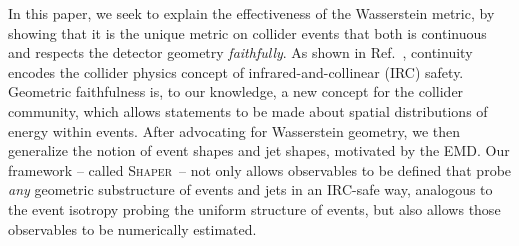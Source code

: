 \documentclass[letterpaper,11pt]{article}
\DeclareRobustCommand{\Refer}[1]{Ref.~\cite{#1}}
\newcommand{\Shaper}{\textsc{Shaper}\xspace}
\begin{document}
In this paper, we seek to explain the effectiveness of the Wasserstein metric, by showing that it is the unique metric on collider events that both is continuous and respects the detector geometry \emph{faithfully}.
%
As shown in \Refer{Komiske_2019}, continuity encodes the collider physics concept of infrared-and-collinear (IRC) safety.
%
Geometric faithfulness is, to our knowledge, a new concept for the collider community, which allows statements to be made about spatial distributions of energy within events. 
%
After advocating for Wasserstein geometry, we then generalize the notion of event shapes and jet shapes, motivated by the EMD.
%
Our framework -- called \Shaper\ -- not only allows observables to be defined that probe \emph{any} geometric substructure of events and jets in an IRC-safe way, analogous to the event isotropy probing the uniform structure of events, but also allows those observables to be numerically estimated.
\end{document}
